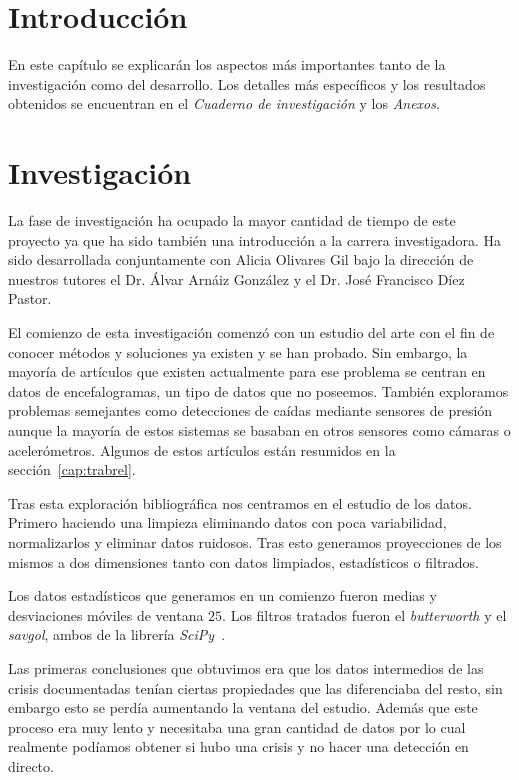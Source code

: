 \section{Introducción}\label{cap:asp-rel}

En este capítulo se explicarán los aspectos más importantes tanto de la investigación como del desarrollo. Los detalles más específicos y los resultados obtenidos se encuentran en el \textit{Cuaderno de investigación} y los \textit{Anexos}. 

\section{Investigación}

La fase de investigación ha ocupado la mayor cantidad de tiempo de este proyecto ya que ha sido también una introducción a la carrera investigadora. Ha sido desarrollada conjuntamente con Alicia Olivares Gil bajo la dirección de nuestros tutores el Dr. Álvar Arnáiz González y el Dr. José Francisco Díez Pastor.

El comienzo de esta investigación comenzó con un estudio del arte con el fin de conocer métodos y soluciones ya existen y se han probado. Sin embargo, la mayoría de artículos que existen actualmente para ese problema se centran en datos de encefalogramas, un tipo de datos que no poseemos. También exploramos problemas semejantes como detecciones de caídas mediante sensores de presión aunque la mayoría de estos sistemas se basaban en otros sensores como cámaras o acelerómetros. Algunos de estos artículos están resumidos en la sección~\ref{cap:trabrel}.

Tras esta exploración bibliográfica nos centramos en el estudio de los datos. Primero haciendo una limpieza eliminando datos con poca variabilidad, normalizarlos y eliminar datos ruidosos. Tras esto generamos proyecciones de los mismos a dos dimensiones tanto con datos limpiados, estadísticos o filtrados.

Los datos estadísticos que generamos en un comienzo fueron medias y desviaciones móviles de ventana $25$. Los filtros tratados fueron el \textit{butterworth} y el \textit{savgol}, ambos de la librería \textit{SciPy}~\cite{tool:scipy}.

Las primeras conclusiones que obtuvimos era que los datos intermedios de las crisis documentadas tenían ciertas propiedades que las diferenciaba del resto, sin embargo esto se perdía aumentando la ventana del estudio. Además que este proceso era muy lento y necesitaba una gran cantidad de datos por lo cual realmente podíamos obtener si hubo una crisis y no hacer una detección en directo.

